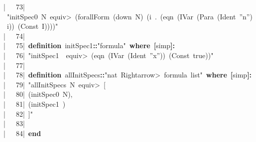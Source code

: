\documentclass{article}
\newcommand{\syntaxKEYWORDA}[1]{\textcolor[rgb]{0.0,0.4,0.6}{\textbf{#1}}}
\newcommand{\syntaxKEYWORDB}[1]{\textcolor[rgb]{0.0,0.6,0.4}{\textbf{#1}}}
\newcommand{\syntaxLITERALA}[1]{\textcolor[rgb]{1.0,0.0,0.8}{#1}}
\newcommand{\syntaxOPERATOR}[1]{\textcolor[rgb]{0.0,0.0,0.0}{\textbf{#1}}}
\newcommand{\syntaxKEYWORDA}[1]{\textcolor[rgb]{0.0,0.4,0.6}{\textbf{#1}}}
\newcommand{\syntaxKEYWORDB}[1]{\textcolor[rgb]{0.0,0.6,0.4}{\textbf{#1}}}
\newcommand{\syntaxLITERALA}[1]{\textcolor[rgb]{1.0,0.0,0.8}{#1}}
\newcommand{\syntaxOPERATOR}[1]{\textcolor[rgb]{0.0,0.0,0.0}{\textbf{#1}}}
\newcommand{\syntaxKEYWORDA}[1]{\textcolor[rgb]{0.0,0.4,0.6}{\textbf{#1}}}
\newcommand{\syntaxKEYWORDB}[1]{\textcolor[rgb]{0.0,0.6,0.4}{\textbf{#1}}}
\newcommand{\syntaxLITERALA}[1]{\textcolor[rgb]{1.0,0.0,0.8}{#1}}
\newcommand{\syntaxOPERATOR}[1]{\textcolor[rgb]{0.0,0.0,0.0}{\textbf{#1}}}
\newcommand{\syntaxKEYWORDA}[1]{\textcolor[rgb]{0.0,0.4,0.6}{#1}}
\newcommand{\syntaxKEYWORDB}[1]{\textcolor[rgb]{0.0,0.6,0.4}{#1}}
\newcommand{\syntaxLITERALA}[1]{\textcolor[rgb]{1.0,0.0,0.8}{\textbf{#1}}}
\newcommand{\syntaxOPERATOR}[1]{\textcolor[rgb]{0.0,0.0,0.0}{#1}}
\newcommand{\syntaxKEYWORDA}[1]{\textcolor[rgb]{0.0,0.4,0.6}{#1}}
\newcommand{\syntaxKEYWORDB}[1]{\textcolor[rgb]{0.0,0.6,0.4}{#1}}
\newcommand{\syntaxLITERALA}[1]{\textcolor[rgb]{1.0,0.0,0.8}{#1}}
\newcommand{\syntaxOPERATOR}[1]{\textcolor[rgb]{0.0,0.0,0.0}{#1}}
\newcommand{\syntaxKEYWORDA}[1]{\textcolor[rgb]{0.0,0.4,0.6}{\textbf{#1}}}
\newcommand{\syntaxKEYWORDB}[1]{\textcolor[rgb]{0.0,0.6,0.4}{\textbf{#1}}}
\newcommand{\syntaxLITERALA}[1]{\textcolor[rgb]{1.0,0.0,0.8}{#1}}
\newcommand{\syntaxOPERATOR}[1]{\textcolor[rgb]{0.0,0.0,0.0}{\textbf{#1}}}
\newcommand{\gutter}[1]{\textcolor[rgb]{0,0,0}{{|}#1}}
\newcommand{\gutterH}[1]{\textcolor[rgb]{1,0,0}{{|}#1}}
\begin{document}
\gutter{\ \ \ 73{|}\ }\syntaxLITERALA{"initSpec0{\ }N{\ }\<equiv>{\ }(forallForm{\ }(down{\ }N){\ }(\usebox{\percentbox}{\ }i{\ }.{\ }(eqn{\ }(IVar{\ }(Para{\ }(Ident{\ }''n''){\ }i)){\ }(Const{\ }I))))"}\hspace*{\fill}\\
\gutter{\ \ \ 74{|}\ }\hspace*{\fill}\\
\gutterH{\ \ \ 75{|}\ }\syntaxKEYWORDA{definition}{\ }initSpec1\syntaxOPERATOR{::}\syntaxLITERALA{"formula"}{\ }\syntaxKEYWORDB{where}{\ }\syntaxOPERATOR{{[}}simp\syntaxOPERATOR{{]}}\syntaxOPERATOR{:}\hspace*{\fill}\\
\gutter{\ \ \ 76{|}\ }\syntaxLITERALA{"initSpec1{\ }{\ }\<equiv>{\ }(eqn{\ }(IVar{\ }(Ident{\ }''x'')){\ }(Const{\ }true))"}\hspace*{\fill}\\
\gutter{\ \ \ 77{|}\ }\hspace*{\fill}\\
\gutter{\ \ \ 78{|}\ }\syntaxKEYWORDA{definition}{\ }allInitSpecs\syntaxOPERATOR{::}\syntaxLITERALA{"nat{\ }\<Rightarrow>{\ }formula{\ }list"}{\ }\syntaxKEYWORDB{where}{\ }\syntaxOPERATOR{{[}}simp\syntaxOPERATOR{{]}}\syntaxOPERATOR{:}\hspace*{\fill}\\
\gutter{\ \ \ 79{|}\ }\syntaxLITERALA{"allInitSpecs{\ }N{\ }\<equiv>{\ }{[}}\hspace*{\fill}\\
\gutterH{\ \ \ 80{|}\ }\syntaxLITERALA{(initSpec0{\ }N),}\hspace*{\fill}\\
\gutter{\ \ \ 81{|}\ }\syntaxLITERALA{(initSpec1{\ })}\hspace*{\fill}\\
\gutter{\ \ \ 82{|}\ }\syntaxLITERALA{{]}"}\hspace*{\fill}\\
\gutter{\ \ \ 83{|}\ }\hspace*{\fill}\\
\gutter{\ \ \ 84{|}\ }\syntaxKEYWORDB{end}\hspace*{\fill}\\
\mbox{}
\normalfont
\end{document}
